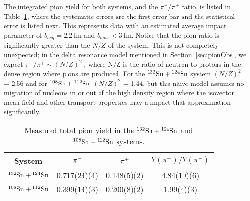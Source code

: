 The integrated pion yield for both systems, and the $\pi^-/\pi^+$ ratio, is listed in Table~\ref{tb:pionyield}, where the systematic errors are the first error bar and the statistical error is listed next. This represents data with an estimated average impact parameter of $b_{avg} = \SI{2.2}{\femto\metre}$ and $b_{max} < \SI{3}{\femto\metre}$. Notice that the pion ratio is significantly greater than the $N/Z$ of the system.  This is not completely unexpected; in the delta resonance model mentioned in Section~\ref{sec:pionObs}, we expect  $\pi^-/\pi^+ \sim (N/Z)^2$ \cite{baoan_piprod1,baoan_piprod2}, where N/Z is the ratio of neutron to protons in the dense region where pions are produced. For the ${}^{132}\mathrm{Sn} + {}^{124}\mathrm{Sn}$ system $(N/Z)^2$ = 2.56 and for ${}^{108}\mathrm{Sn} + {}^{112}\mathrm{Sn}$ $(N/Z)^2$ = 1.44, but this n\"aive model assumes no migration of nucleons in or out of the high density region where the isovector mean field and other transport properties may a impact that approximation significantly. 



\begin{table*}\centering
{}
\begin{tabular}{@{}cccc@{}}\toprule
System & $\pi^-$ & $\pi^+$ & $Y(\pi^-)/Y(\pi^+)$  \\
\midrule
${}^{132}\mathrm{Sn} + {}^{124}\mathrm{Sn}$ & 0.717(24)(4) & 0.148(5)(2) & 4.84(10)(6)  \\
${}^{108}\mathrm{Sn} + {}^{112}\mathrm{Sn}$ & 0.399(14)(3) & 0.200(8)(2) & 1.99(4)(3)  \\
\bottomrule
\end{tabular}
\caption{Measured total pion yield in the ${}^{132}\mathrm{Sn} + {}^{124}\mathrm{Sn}$ and ${}^{108}\mathrm{Sn} + {}^{112}\mathrm{Sn}$ systems.}
\label{tb:pionyield}
\end{table*}


